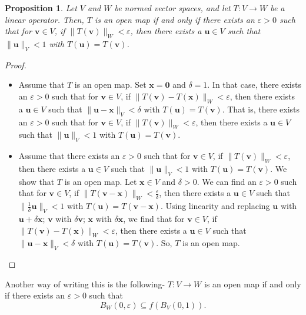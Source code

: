 \documentclass[a4paper, openany]{memoir}
\theoremstyle{definition}
\theoremstyle{plain}
\newtheorem{proposition}[definition]{Proposition}
\begin{document}
    \begin{proposition}
        Let $V$ and $W$ be normed vector spaces, and let $T: V \to W$ be a linear operator. Then, $T$ is an open map if and only if there exists an $\varepsilon > 0$ such that for $\bm{v} \in V$, if $\lVert T(\bm{v}) \rVert_W < \varepsilon$, then there exists a $\bm{u} \in V$ such that $\lVert \bm{u} \rVert_V < 1$ with $T(\bm{u}) = T(\bm{v})$.
    \end{proposition}
    \begin{proof}
        \hspace*{0pt}
        \begin{itemize}
            \item Assume that $T$ is an open map. Set $\bm{x} = \bm{0}$ and $\delta = 1$. In that case, there exists an $\varepsilon > 0$ such that for $\bm{v} \in V$, if $\lVert T(\bm{v}) - T(\bm{x}) \rVert_W < \varepsilon$, then there exists a $\bm{u} \in V$ such that $\lVert \bm{u} - \bm{x} \rVert_V < \delta$ with $T(\bm{u}) = T(\bm{v})$. That is, there exists an $\varepsilon > 0$ such that for $\bm{v} \in V$, if $\lVert T(\bm{v}) \rVert_W < \varepsilon$, then there exists a $\bm{u} \in V$ such that $\lVert \bm{u} \rVert_V < 1$ with $T(\bm{u}) = T(\bm{v})$.
            
            \item Assume that there exists an $\varepsilon > 0$ such that for $\bm{v} \in V$, if $\lVert T(\bm{v}) \rVert_W < \varepsilon$, then there exists a $\bm{u} \in V$ such that $\lVert \bm{u} \rVert_V < 1$ with $T(\bm{u}) = T(\bm{v})$. We show that $T$ is an open map. Let $\bm{x} \in V$ and $\delta > 0$. We can find an $\varepsilon > 0$ such that for $\bm{v} \in V$, if $\lVert T(\bm{v} - \bm{x}) \rVert_W < \frac{\varepsilon}{\delta}$, then there exists a $\bm{u} \in V$ such that $\lVert \frac{1}{\delta}\bm{u} \rVert_V < 1$ with $T(\bm{u}) = T(\bm{v} - \bm{x})$. Using linearity and replacing $\bm{u}$ with $\bm{u} + \delta\bm{x}$; $\bm{v}$ with $\delta \bm{v}$; $\bm{x}$ with $\delta \bm{x}$, we find that for $\bm{v} \in V$, if $\lVert T(\bm{v}) - T(\bm{x}) \rVert_W < \varepsilon$, then there exists a $\bm{u} \in V$ such that $\lVert \bm{u} - \bm{x} \rVert_V < \delta$ with $T(\bm{u}) = T(\bm{v})$. So, $T$ is an open map.
        \end{itemize}
    \end{proof}
    \noindent Another way of writing this is the following- $T: V \to W$ is an open map if and only if there exists an $\varepsilon > 0$ such that
    \[B_W(0, \varepsilon) \subseteq f(B_V(0, 1)).\]
\end{document}
